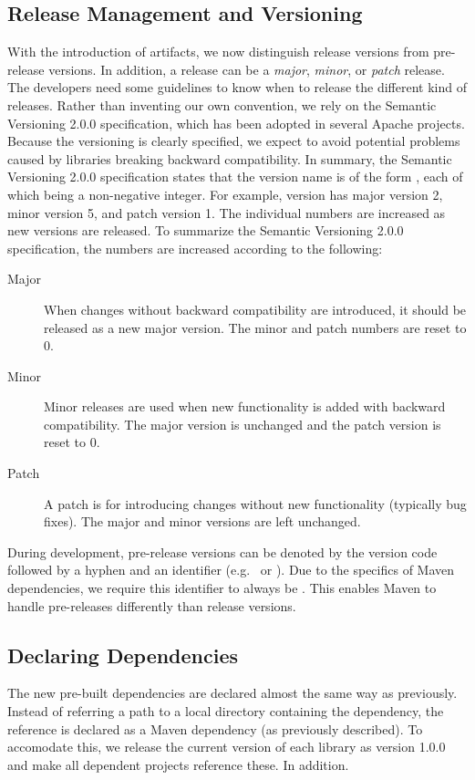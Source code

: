 \subsection{Release Management and Versioning}
With the introduction of artifacts, we now distinguish release versions from pre-release versions. In addition, a release can be a \emph{major}, \emph{minor}, or \emph{patch} release. The developers need some guidelines to know when to release the different kind of releases. Rather than inventing our own convention, we rely on the Semantic Versioning 2.0.0 specification\parencite{semver2015}, which has been adopted in several Apache projects\parencite{apacheapr,apacheisis,apacheaccumulo}. Because the versioning is clearly specified, we expect to avoid potential problems caused by libraries breaking backward compatibility. In summary, the Semantic Versioning 2.0.0 specification states that the version name is of the form , each of which being a non-negative integer. For example, version  has major version 2, minor version 5, and patch version 1. The individual numbers are increased as new versions are released. To summarize the Semantic Versioning 2.0.0 specification, the numbers are increased according to the following:
\begin{description}
  \item[Major] When changes without backward compatibility are introduced, it should be released as a new major version. The minor and patch numbers are reset to 0.
  \item[Minor] Minor releases are used when new functionality is added with backward compatibility. The major version is unchanged and the patch version is reset to 0.
  \item[Patch] A patch is for introducing changes without new functionality (typically bug fixes). The major and minor versions are left unchanged.
\end{description}

During development, pre-release versions can be denoted by the version code followed by a hyphen and an identifier (e.g.\  or ). Due to the specifics of Maven dependencies, we require this identifier to always be . This enables Maven to handle pre-releases differently than release versions.

\subsection{Declaring Dependencies}
The new pre-built dependencies are declared almost the same way as previously. Instead of referring a path to a local directory containing the dependency, the reference is declared as a Maven dependency (as previously described). To accomodate this, we release the current version of each library as version 1.0.0 and make all dependent projects reference these. In addition.

